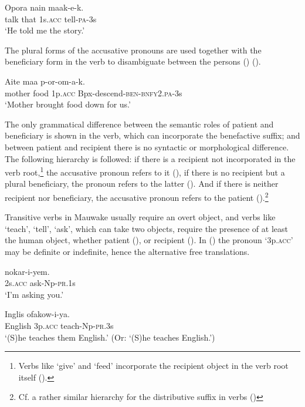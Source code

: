 \ea%
\label{ex:x550}
\gll Opora nain  maak-e-k. \\
talk that 1s.\textsc{acc} tell-\textsc{pa}-3s\\
\glt`He told me the story.' 
\z

The plural forms of the accusative pronouns are used together with the beneficiary form in the verb to disambiguate between the persons () ().

\ea%
\label{ex:x549}
\gll Aite maa  p-or-om-a-k. \\
mother food 1p.\textsc{acc} Bpx-descend-\textsc{ben}-\textsc{bnfy}2.\textsc{pa}-3s\\
\glt`Mother brought food down for us.'
\z

The only grammatical difference between the semantic roles of patient and beneficiary is shown in the verb, which can incorporate the benefactive suffix; and between patient and recipient there is no syntactic or morphological difference. The following hierarchy is followed: if there is a recipient not incorporated in the verb root,\footnote{Verbs like `give' and `feed' incorporate the recipient object in the verb root itself ().} the accusative pronoun refers to it (), if there is no recipient but a plural beneficiary, the pronoun refers to the latter (). And if there is neither recipient nor beneficiary, the accusative pronoun refers to the patient ().\footnote{Cf. a rather similar hierarchy for the distributive suffix in verbs ()} 

Transitive verbs in Mauwake usually require an overt object, and verbs like `teach', `tell', `ask', which can take two objects, require the presence of at least the human object, whether patient (), or recipient (). In () the pronoun  `3p.\textsc{acc}' may be definite or indefinite, hence the alternative free translations.

\ea%
\label{ex:x552}
\gll {} nokar-i-yem. \\
2s.\textsc{acc} ask-Np-\textsc{pr}.1s\\
\glt`I'm asking you.'
\z

\ea%
\label{ex:x551}
\gll Inglis  ofakow-i-ya. \\
English 3p.\textsc{acc} teach-Np-\textsc{pr}.3s\\
\glt`(S)he teaches them English.' (Or: `(S)he teaches English.')
\z

